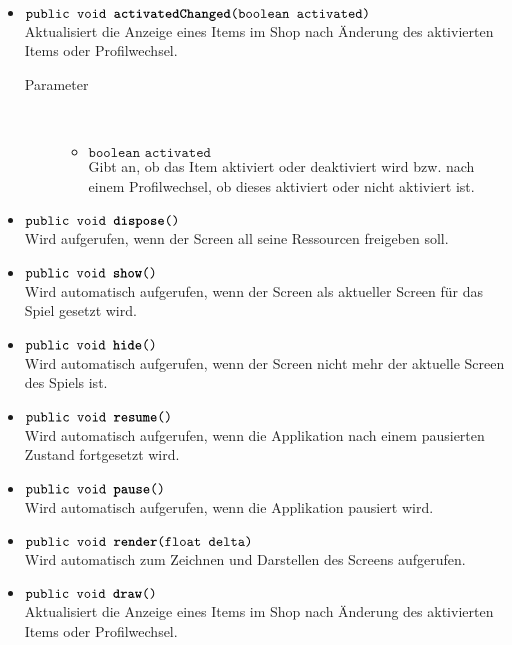 \begin{description}
\begin{itemize}
		\item $\texttt{public void \textbf{activatedChanged}(boolean activated)}$ \\ Aktualisiert die Anzeige eines Items im Shop nach Änderung des aktivierten Items oder Profilwechsel.
		\begin{description}
			\item[Parameter] \hfill \\
			\vspace{-.8cm}
			\begin{itemize}
				\item $\texttt{boolean activated}$ \\ Gibt an, ob das Item aktiviert oder deaktiviert wird bzw. nach einem Profilwechsel, ob dieses aktiviert oder nicht aktiviert ist.
			\end{itemize}
			\end{description}
			
		\item $\texttt{public void \textbf{dispose}()}$ \\ Wird aufgerufen, wenn der Screen all seine Ressourcen freigeben soll.
		
		\item $\texttt{public void \textbf{show}()}$ \\ Wird automatisch aufgerufen, wenn der Screen als aktueller Screen für das Spiel gesetzt wird.
	
		\item $\texttt{public void \textbf{hide}()}$ \\ Wird automatisch aufgerufen, wenn der Screen nicht mehr der aktuelle Screen des Spiels ist.
	
		\item $\texttt{public void \textbf{resume}()}$ \\ Wird automatisch aufgerufen, wenn die Applikation nach einem pausierten Zustand fortgesetzt wird.	
	
		\item $\texttt{public void \textbf{pause}()}$ \\ Wird automatisch aufgerufen, wenn die Applikation pausiert wird.
	
		\item $\texttt{public void \textbf{render}(float delta)}$ \\ Wird automatisch zum Zeichnen und Darstellen des Screens aufgerufen.
			
		\item $\texttt{public void \textbf{draw}()}$ \\ Aktualisiert die Anzeige eines Items im Shop nach Änderung des aktivierten Items oder Profilwechsel.


		\end{itemize}
	\end{description}
	
